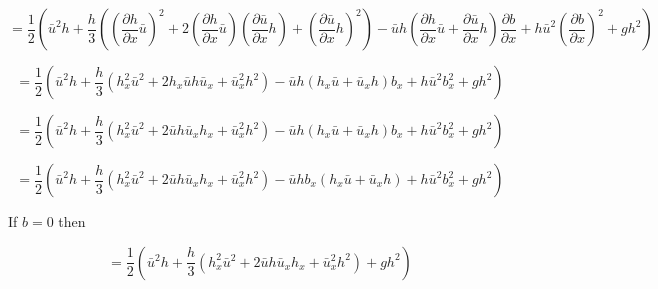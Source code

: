 \documentclass[12pt]{article}
\begin{document}
\[ = \frac{1}{2} \left( \bar{u}^2h + \frac{h}{3}\left( \left(\frac{\partial h}{\partial x}\bar{u}\right)^2 + 2 \left(\frac{\partial h}{\partial x}\bar{u}\right) \left(\frac{\partial \bar{u}}{\partial x}h\right) + \left(\frac{\partial \bar{u}}{\partial x}h\right)^2 \right)  - \bar{u}h  \left(\frac{\partial h}{\partial x}\bar{u} + \frac{\partial \bar{u}}{\partial x}h\right)\frac{\partial b}{\partial x}  + h\bar{u} ^2\left( \frac{\partial b}{\partial x} \right)^2 + gh^2 \right)\]

\[ = \frac{1}{2} \left( \bar{u}^2h + \frac{h}{3}\left( h_x^2 \bar{u}^2 +  2h _x \bar{u} h \bar{u}_x + \bar{u}^2_xh^2 \right)  - \bar{u}h  \left(h_x\bar{u} + \bar{u}_xh\right) b_x  + h\bar{u} ^2b_x^2  + gh^2 \right)\]

\[ = \frac{1}{2} \left( \bar{u}^2h + \frac{h}{3}\left( h_x^2 \bar{u}^2 +  2\bar{u} h \bar{u}_xh_x + \bar{u}^2_xh^2 \right)  - \bar{u}h  \left(h_x\bar{u} + \bar{u}_xh\right) b_x  + h\bar{u} ^2b_x^2  + gh^2 \right)\]

\[ = \frac{1}{2} \left( \bar{u}^2h + \frac{h}{3}\left( h_x^2 \bar{u}^2 +  2\bar{u} h \bar{u}_xh_x + \bar{u}^2_xh^2 \right)  - \bar{u}hb_x   \left(h_x\bar{u} + \bar{u}_xh\right) + h\bar{u} ^2b_x^2  + gh^2 \right)\]

If $b= 0$ then

\[ = \frac{1}{2} \left( \bar{u}^2h + \frac{h}{3}\left( h_x^2 \bar{u}^2 +  2\bar{u} h \bar{u}_xh_x + \bar{u}^2_xh^2 \right)   + gh^2  \right)\]
\end{document}
